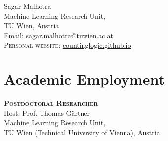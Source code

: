 \documentclass[10pt, a4paper]{article}
\newcommand{\years}[1]{\marginnote{\scriptsize #1}}
\begin{document}
{\LARGE Sagar Malhotra }\\[0.2cm]
Machine Learning Research Unit,\\
TU Wien, Austria\\ 

Email: \href{mailto:sagar.malhotra@tuwien.ac.at}{sagar.malhotra@tuwien.ac.at}\\
\textsc{Personal website}: \href{https://countinglogic.github.io}{countinglogic.github.io}

\section*{Academic Employment}
\noindent
\years{2023-now}\textsc{\textbf{Postdoctoral Researcher}}\\
Host: Prof. Thomas G\"{a}rtner\\
Machine Learning Research Unit,\\
TU Wien (Technical University of Vienna), Austria
\end{document}
